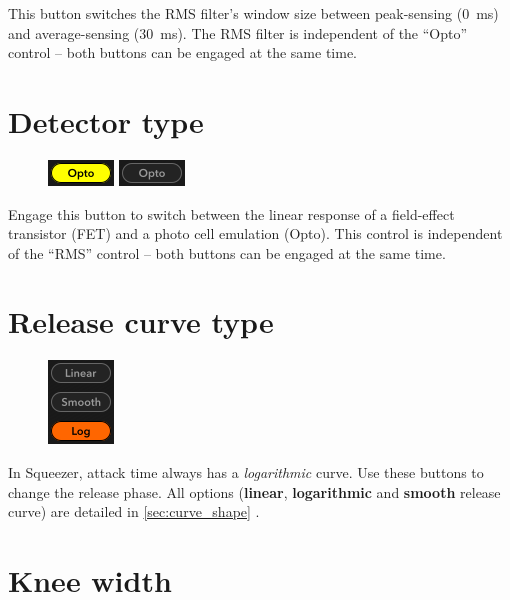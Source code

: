 This button switches the RMS filter's window size between peak-sensing
(\SI{0}{\milli\second}) and average-sensing (\SI{30}{\milli\second}).
The RMS filter is independent of the ``Opto'' control -- both buttons
can be engaged at the same time.

\section{Detector type}

\begin{figure}
  \includegraphics[scale=\screenshotscale,clip]{include/images/button_opto_on.png}
  \newline \vspace{-0.9\baselineskip}
  \includegraphics[scale=\screenshotscale,clip]{include/images/button_opto_off.png}
\end{figure}

Engage this button to switch between the linear response of a
field-effect transistor (FET) and a photo cell emulation (Opto).  This
control is independent of the ``RMS'' control -- both buttons can be
engaged at the same time.

\section{Release curve type}

\begin{figure}
  \includegraphics[scale=\screenshotscale,clip]{include/images/buttons_release_curve.png}
\end{figure}

In Squeezer, attack time always has a \emph{logarithmic} curve.  Use
these buttons to change the release phase.  All options
(\textbf{linear}, \textbf{logarithmic} and \textbf{smooth} release
curve) are detailed in \ref{sec:curve_shape} .

\section{Knee width}

